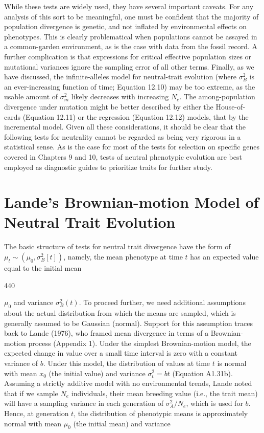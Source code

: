 \documentclass{article}
\begin{document}
While these tests are widely used, they have several important caveats. For any analysis of this sort to be meaningful, one must be confident that the majority of population divergence is genetic, and not inflated by environmental effects on phenotypes. This is clearly problematical when populations cannot be assayed in a common-garden environment, as is the case with data from the fossil record. A further complication is that expressions for critical effective population sizes or mutational variances ignore the sampling error of all other terms. Finally, as we have discussed, the infinite-alleles model for neutral-trait evolution (where  $ \sigma_{B}^{2} $ is an ever-increasing function of time; Equation 12.10) may be too extreme, as the usable amount of  $ \sigma_{m}^{2} $ likely decreases with increasing  $ N_{e} $. The among-population divergence under mutation might be better described by either the House-of-cards (Equation 12.11) or the regression (Equation 12.12) models, that by the incremental model. Given all these considerations, it should be clear that the following tests for neutrality cannot be regarded as being very rigorous in a statistical sense. As is the case for most of the tests for selection on specific genes covered in Chapters 9 and 10, tests of neutral phenotypic evolution are best employed as diagnostic guides to prioritize traits for further study.

\section{Lande's Brownian-motion Model of Neutral Trait Evolution}
The basic structure of tests for neutral trait divergence have the form of  $ \mu_t \sim (\mu_0, \sigma_B^2[t]) $, namely, the mean phenotype at time  $ t $ has an expected value equal to the initial mean

440

$\mu_0$ and variance $\sigma_B^2(t)$. To proceed further, we need additional assumptions about the actual distribution from which the means are sampled, which is generally assumed to be Gaussian (normal). Support for this assumption traces back to Lande (1976), who framed mean divergence in terms of a Brownian-motion process (Appendix 1). Under the simplest Brownian-motion model, the expected change in value over a small time interval is zero with a constant variance of $b$. Under this model, the distribution of values at time $t$ is normal with mean $x_0$ (the initial value) and variance $\sigma_t^2 = b t$ (Equation A1.31b). Assuming a strictly additive model with no environmental trends, Lande noted that if we sample $N_e$ individuals, their mean breeding value (i.e., the trait mean) will have a sampling variance in each generation of $\sigma_A^2 / N_e$, which is used for $b$. Hence, at generation $t$, the distribution of phenotypic means is approximately normal with mean $\mu_0$ (the initial mean) and variance
\end{document}
